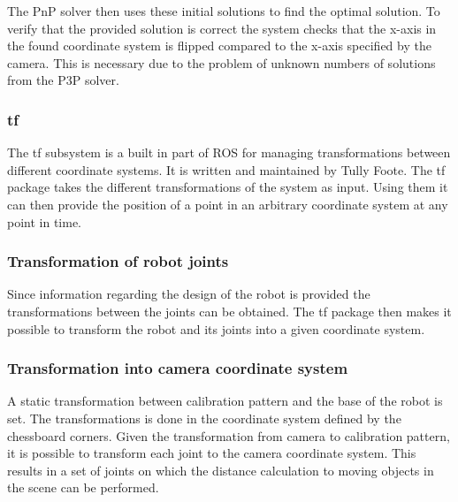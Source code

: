 The PnP solver then uses these initial solutions to find the optimal solution.
To verify that the provided solution is correct the system checks that the x-axis in the found coordinate system is flipped compared to the x-axis specified by the camera.
This is necessary due to the problem of unknown numbers of solutions from the P3P solver.


\subsubsection{tf}
The tf \cite{tf} subsystem is a built in part of ROS for managing transformations between different coordinate systems. It is written and maintained by Tully Foote. The tf package takes the different transformations of the system as input. Using them it can then provide the position of a point in an arbitrary coordinate system at any point in time.

\subsubsection{Transformation of robot joints}
Since information regarding the design of the robot is provided the transformations between the joints can be obtained. The tf package then makes it possible to transform the robot and its joints into a given coordinate system.

\subsubsection{Transformation into camera coordinate system}
A static transformation between calibration pattern and the base of the robot is set. 
The transformations is done in the coordinate system defined by the chessboard corners.
Given the transformation from camera to calibration pattern, it is possible to transform each joint to the camera coordinate system. This results in a set of joints on which the distance calculation to moving objects in the scene can be performed. 
